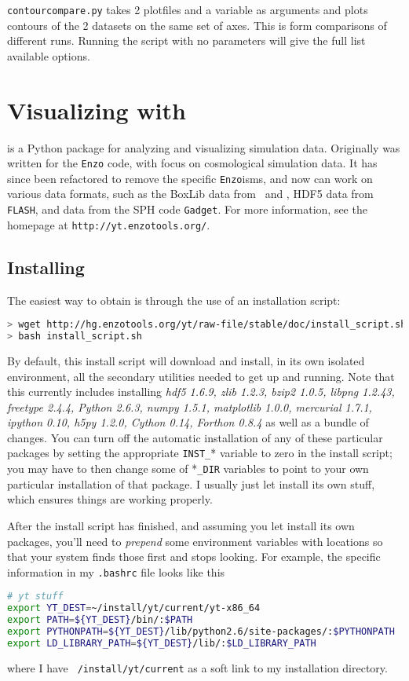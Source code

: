 {\tt contourcompare.py} takes 2 plotfiles and a variable as arguments
and plots contours of the 2 datasets on the same set of axes.  This is 
form comparisons of different runs.  Running the script with no parameters
will give the full list available options.




\section{Visualizing with \yt}
\yt is a Python package for analyzing and visualizing simulation data.
Originally \yt was written for the {\tt Enzo} code, with focus on
cosmological simulation data.  It has since been refactored to remove
the specific {\tt Enzo}isms, and now can work on various data formats,
such as the BoxLib data from \maestro\ and \castro, HDF5 data
from {\tt FLASH}, and data from the SPH code {\tt Gadget}.  For more
information, see the \yt homepage at {\tt http://yt.enzotools.org/}.

\subsection{Installing \yt}
The easiest way to obtain \yt is through the use of an installation script:
\begin{lstlisting}[language=bash,mathescape=false]
> wget http://hg.enzotools.org/yt/raw-file/stable/doc/install_script.sh
> bash install_script.sh
\end{lstlisting}
By default, this \yt install script will download and install, in its
own isolated environment, all the secondary utilities needed to get \yt
up and running.  Note that this currently includes installing {\it
  hdf5 1.6.9, zlib 1.2.3, bzip2 1.0.5, libpng 1.2.43, freetype 2.4.4,
  Python 2.6.3, numpy 1.5.1, matplotlib 1.0.0, mercurial 1.7.1,
  ipython 0.10, h5py 1.2.0, Cython 0.14, Forthon 0.8.4} as well as a
 bundle of changes.  You can turn off the automatic
installation of any of these particular packages by setting the
appropriate {\tt INST\_}* variable to zero in the install script;
you may have to then change some of *{\tt \_DIR} variables to point to
your own particular installation of that package.  I usually just let
\yt install its own stuff, which ensures things are working properly.

After the install script has finished, and assuming you let \yt install its own packages, you'll need to {\it prepend} some environment variables with \yt locations so that your system finds those first and stops looking.  For example, the \yt specific information in my {\tt .bashrc} file looks like this
\begin{lstlisting}[language=bash,mathescape=false]
# yt stuff
export YT_DEST=~/install/yt/current/yt-x86_64
export PATH=${YT_DEST}/bin/:$PATH
export PYTHONPATH=${YT_DEST}/lib/python2.6/site-packages/:$PYTHONPATH
export LD_LIBRARY_PATH=${YT_DEST}/lib/:$LD_LIBRARY_PATH
\end{lstlisting}
where I have {\tt ~/install/yt/current} as a soft link to my \yt
installation directory.

